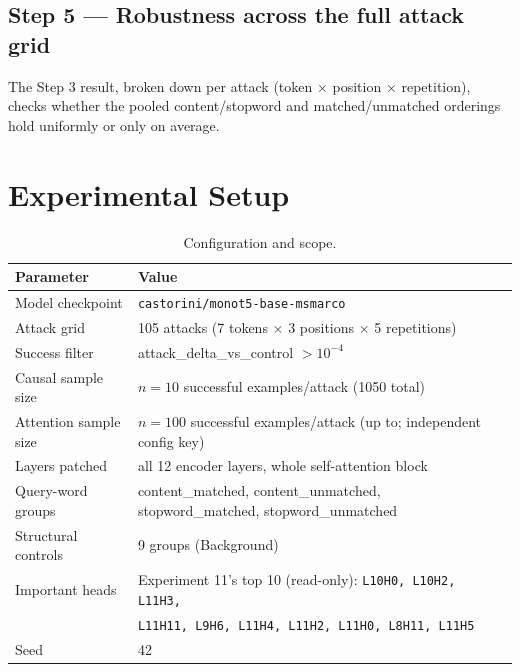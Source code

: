 \documentclass[11pt]{article}
\begin{document}
\subsection{Step 5 --- Robustness across the full attack grid}
The Step 3 result, broken down per attack (token $\times$ position $\times$ repetition),
checks whether the pooled content/stopword and matched/unmatched orderings hold uniformly
or only on average.

\section{Experimental Setup}

\begin{table}[H]
\centering
\caption{Configuration and scope.}
\begin{tabular}{ll}
\toprule
Parameter & Value \\
\midrule
Model checkpoint & \texttt{castorini/monot5-base-msmarco} \\
Attack grid & 105 attacks (7 tokens $\times$ 3 positions $\times$ 5 repetitions) \\
Success filter & attack\_delta\_vs\_control $> 10^{-4}$ \\
Causal sample size & $n{=}10$ successful examples/attack (1050 total) \\
Attention sample size & $n{=}100$ successful examples/attack (up to; independent config key) \\
Layers patched & all 12 encoder layers, whole self-attention block \\
Query-word groups & content\_matched, content\_unmatched, stopword\_matched, stopword\_unmatched \\
Structural controls & 9 groups (Background) \\
Important heads & Experiment 11's top 10 (read-only): \texttt{L10H0, L10H2, L11H3,} \\
                 & \texttt{L11H11, L9H6, L11H4, L11H2, L11H0, L8H11, L11H5} \\
Seed & 42 \\
\bottomrule
\end{tabular}
\end{table}
\end{document}
